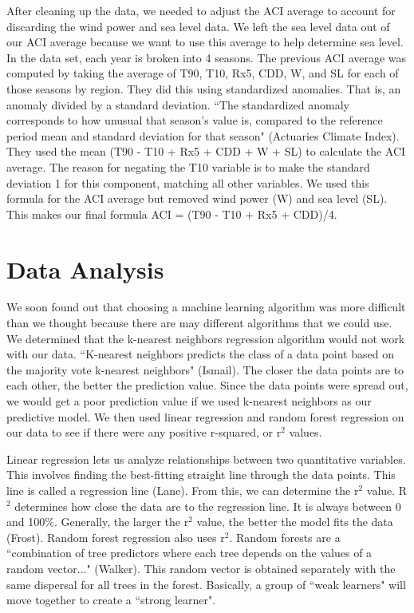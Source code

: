 \documentclass[12pt]{report}
\begin{document}
		\par After cleaning up the data, we needed to adjust the ACI average to account for discarding the wind power and sea level data. We left the sea level data out of our ACI average because we want to use this average to help determine sea level. In the data set, each year is broken into 4 seasons. The previous ACI average was computed by taking the average of T90, T10, Rx5, CDD, W, and SL for each of those seasons by region. They did this using standardized anomalies. That is, an anomaly divided by a standard deviation. \textquotedblleft The standardized anomaly corresponds to how unusual that season's value is, compared to the reference period mean and standard deviation for that season" (Actuaries Climate Index). They used the mean (T90 - T10 + Rx5 + CDD + W + SL) to calculate the ACI average. The reason for negating the T10 variable is to make the standard deviation 1 for this component, matching all other variables. We used this formula for the ACI average but removed wind power (W) and sea level (SL). This makes our final formula ACI = (T90 - T10 + Rx5 + CDD)/4.
		
\section* {Data Analysis} 
		
\indent	\par We soon found out that choosing a machine learning algorithm was more difficult than we thought because there are may different algorithms that we could use. We determined that the k-nearest neighbors regression algorithm would not work with our data. \textquotedblleft K-nearest neighbors predicts the class of a data point based on the majority vote k-nearest neighbors" (Ismail). The closer the data points are to each other, the better the prediction value. Since the data points were spread out, we would get a poor prediction value if we used k-nearest neighbors as our predictive model. We then used linear regression and random forest regression on our data to see if there were any positive r-squared, or r$^2$ values. 
\par Linear regression lets us analyze relationships between two quantitative variables. This involves finding the best-fitting straight line through the data points. This line is called a regression line (Lane). From this, we can determine the r$^2$ value. R$^2$ determines how close the data are to the regression line. It is always between 0 and 100\%. Generally, the larger the r$^2$ value, the better the model fits the data (Frost). Random forest regression also uses r$^2$. Random forests are a  \textquotedblleft combination of tree predictors where each tree depends on the values of a random vector..." (Walker). This random vector is obtained separately with the same dispersal for all trees in the forest. Basically, a group of \textquotedblleft weak learners" will move together to create a \textquotedblleft strong learner".
\end{document}
